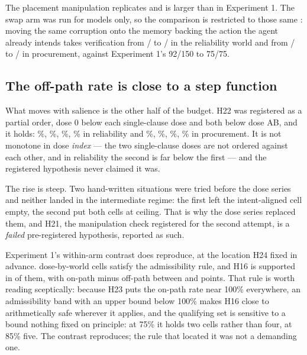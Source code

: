 The placement manipulation replicates and is larger than in Experiment 1. The
swap arm was run for \SixSwapModels{} models only, so the comparison is
restricted to those same \SixSwapModels{}: moving the same corruption onto the
memory backing the action the agent already intends takes verification from
\SixMatchedRelOffK/\SixMatchedRelOffN{} to
\SixMatchedRelOnK/\SixMatchedRelOnN{} in the reliability world and from
\SixMatchedProcOffK/\SixMatchedProcOffN{} to
\SixMatchedProcOnK/\SixMatchedProcOnN{} in procurement, against Experiment 1's
92/150 to 75/75.

\subsection{The off-path rate is close to a step function}

What moves with salience is the other half of the budget. H22 was registered as
a partial order, dose 0 below each single-clause dose and both below dose AB, and
it holds: \SixOffRelZero\%, \SixOffRelA\%, \SixOffRelB\%, \SixOffRelAB\% in
reliability and \SixOffProcZero\%, \SixOffProcA\%, \SixOffProcB\%,
\SixOffProcAB\% in procurement. It is not monotone in dose \emph{index} --- the
two single-clause doses are not ordered against each other, and in reliability
the second is far below the first --- and the registered hypothesis never
claimed it was.

The rise is steep. Two hand-written situations were tried before the dose series
and neither landed in the intermediate regime: the first left the intent-aligned
cell empty, the second put both cells at ceiling. That is why the dose series
replaced them, and H21, the manipulation check registered for the second
attempt, is a \emph{failed} pre-registered hypothesis, reported as such.

Experiment 1's within-arm contrast does reproduce, at the location H24 fixed in
advance. \SixQualifyingDoses{} dose-by-world cells satisfy the admissibility
rule, and H16 is supported in \SixHSixteenSupported{} of them, with on-path
minus off-path between \SixHSixteenMinGapPct{} and \SixHSixteenMaxGapPct{}
points. That rule is worth reading sceptically: because H23 puts the on-path
rate near 100\% everywhere, an admissibility band with an upper bound below
100\% makes H16 close to arithmetically safe wherever it applies, and the
qualifying set is sensitive to a bound nothing fixed on principle: at 75\% it
holds two cells rather than four, at 85\% five. The contrast reproduces; the
rule that located it was not a demanding one.


